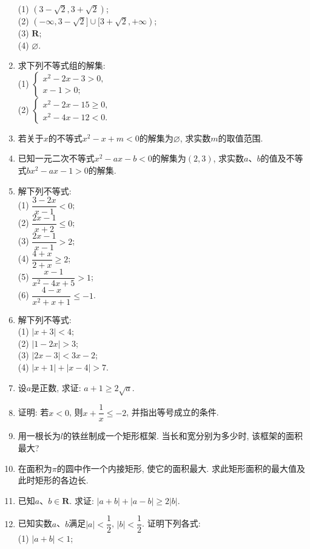 \documentclass[10pt,a4paper]{article}
\begin{document}
\begin{enumerate}[1.]
(1) $(3-\sqrt 2, 3+\sqrt 2)$;\\
(2) $(-\infty, 3-\sqrt 2]\cup [3+\sqrt 2, +\infty)$;\\
(3) $\mathbf{R}$;\\
(4) $\varnothing$.
\item 求下列不等式组的解集:\\
(1) $\begin{cases} x^2-2x-3>0, \\ x-1>0; \end{cases}$\\
(2) $\begin{cases} x^2-2x-15\ge 0, \\ x^2-4x-12<0. \end{cases}$\\
\item 若关于$x$的不等式$x^2-x+m<0$的解集为$\varnothing$, 求实数$m$的取值范围.
\item 已知一元二次不等式$x^2-ax-b<0$的解集为$(2, 3)$, 求实数$a$、$b$的值及不等式$bx^2-ax-1>0$的解集.
\item 解下列不等式:\\
(1) $\dfrac{3-2x}{x-1}<0$;\\
(2) $\dfrac{2x-1}{x+2}\le 0$;\\
(3) $\dfrac{2x-1}{x-1}>2$;\\
(4) $\dfrac{4+x}{2+x}\ge 2$;\\
(5) $\dfrac{x-1}{x^2-4x+5}>1$;\\
(6) $\dfrac{4-x}{x^2+x+1}\le -1$. 
\item 解下列不等式:\\
(1) $|x+3|<4$;\\
(2) $|1-2x|>3$;\\
(3) $|2x-3|<3x-2$;\\
(4) $|x+1|+|x-4|>7$. 
\item 设$a$是正数, 求证: $a+1\ge 2\sqrt a$.
\item 证明: 若$x<0$, 则$x+\dfrac 1x\le -2$, 并指出等号成立的条件.
\item 用一根长为$l$的铁丝制成一个矩形框架. 当长和宽分别为多少时, 该框架的面积最大?
\item 在面积为$\pi$的圆中作一个内接矩形, 使它的面积最大. 求此矩形面积的最大值及此时矩形的各边长.  
\item 已知$a$、$b\in \mathbf{R}$. 求证: $|a+b| +|a-b| \ge 2|b|$.
\item 已知实数$a$、$b$满足$|a| <\dfrac 12$, $|b| <\dfrac 12$. 证明下列各式:\\
(1) $|a+b| <1$;\\

\end{enumerate}
\end{document}
